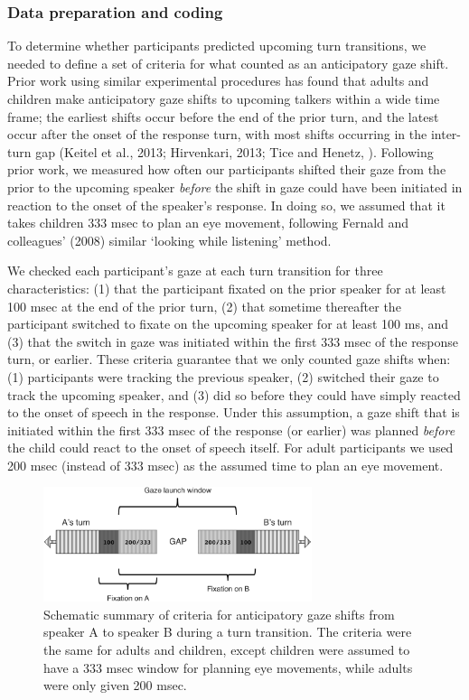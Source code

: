 \documentclass[authoryear, 12pt]{elsarticle}
\begin{document}
\subsubsection{Data preparation and coding}
\label{sec:algorithm}

To determine whether participants predicted upcoming turn transitions, we needed to define a set of criteria for what counted as an anticipatory gaze shift. Prior work using similar experimental procedures has found that adults and children make anticipatory gaze shifts to upcoming talkers within a wide time frame; the earliest shifts occur before the end of the prior turn, and the latest occur after the onset of the response turn, with most shifts occurring in the inter-turn gap (Keitel et al., 2013; Hirvenkari, 2013; Tice and Henetz, \citeyear{TiceHenetz11}). Following prior work, we measured how often our participants shifted their gaze from the prior to the upcoming speaker \textit{before} the shift in gaze could have been initiated in reaction to the onset of the speaker's response. In doing so, we assumed that it takes children 333 msec to plan an eye movement, following Fernald and colleagues' (2008) similar `looking while listening' method.

We checked each participant's gaze at each turn transition for three characteristics: (1) that the participant fixated on the prior speaker for at least 100 msec at the end of the prior turn, (2) that sometime thereafter the participant switched to fixate on the upcoming speaker for at least 100 ms, and (3) that the switch in gaze was initiated within the first 333 msec of the response turn, or earlier. These criteria guarantee that we only counted gaze shifts when: (1) participants were tracking the previous speaker, (2) switched their gaze to track the upcoming speaker, and (3) did so before they could have simply reacted to the onset of speech in the response. Under this assumption, a gaze shift that is initiated within the first 333 msec of the response (or earlier) was planned \textit{before} the child could react to the onset of speech itself. For adult participants we used 200 msec (instead of 333 msec) as the assumed time to plan an eye movement.

\begin{figure}[t]
\begin{center}
\includegraphics[width=0.7\textwidth]{figures/FIG-AnticipCriteria.png}
\end{center}
\caption{Schematic summary of criteria for anticipatory gaze shifts from speaker A to speaker B during a turn transition. The criteria were the same for adults and children, except children were assumed to have a 333 msec window for planning eye movements, while adults were only given 200 msec.} 
\label{fig:criterion}
\end{figure}
\end{document}
